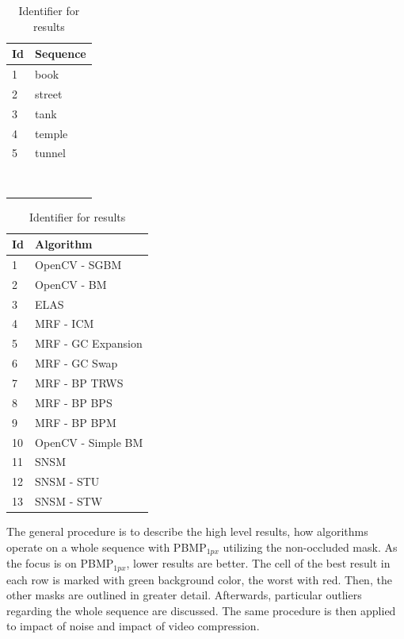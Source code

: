 \begin{table}[h!]
\centering
\begin{tabular}{ll}
  \hline
  \textbf{Id} & \textbf{Sequence} \\ \hline \hline
  1 & book \\
  2 & street \\
  3 & tank \\
  4 & temple \\
  5 & tunnel \\
  & \\
  & \\
  & \\
  & \\
  & \\
  & \\
  & \\
  & \\
  \hline
\end{tabular}
\quad
\begin{tabular}{ll}
  \hline
  \textbf{Id} & \textbf{Algorithm} \\ \hline \hline
  1 & OpenCV - SGBM \\
  2 & OpenCV - BM \\
  3 & ELAS \\
  4 & MRF - ICM \\
  5 & MRF - GC Expansion \\
  6 & MRF - GC Swap \\
  7 & MRF - BP TRWS \\
  8 & MRF - BP BPS \\
  9 & MRF - BP BPM \\
  10 & OpenCV - Simple BM \\
  11 & SNSM \\
  12 & SNSM - STU \\
  13 & SNSM - STW \\
  \hline
\end{tabular}
\caption{Identifier for results}
\label{tab:identifier1}
\end{table}

\noindent The general procedure is to describe the high level results, how algorithms operate on a whole sequence with PBMP$_{1px}$ utilizing the non-occluded mask.
As the focus is on PBMP$_{1px}$, lower results are better.
The cell of the best result in each row is marked with green background color, the worst with red.
Then, the other masks are outlined in greater detail.
Afterwards, particular outliers regarding the whole sequence are discussed.
The same procedure is then applied to impact of noise and impact of video compression.

